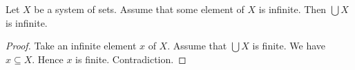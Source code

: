 \documentclass[../../set-theory.tex]{subfiles}
\begin{document}
\begin{forthel}
    \begin{proposition}\label{SetTheory_03_01_403208}
      Let $X$ be a system of sets.
      Assume that some element of $X$ is infinite.
      Then $\bigcup X$ is infinite.
    \end{proposition}
    \begin{proof}
      Take an infinite element $x$ of $X$.
      Assume that $\bigcup X$ is finite.
      We have $x \subseteq X$.
      Hence $x$ is finite.
      Contradiction.
    \end{proof}
  \end{forthel}
\end{document}

